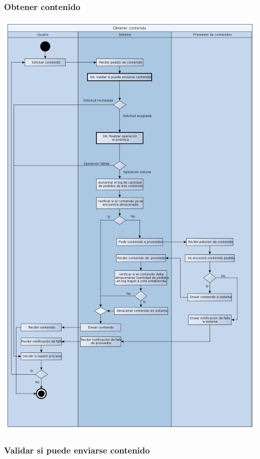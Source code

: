 \documentclass[11pt, a4paper, spanish]{article}
\begin{document}
{\newpage

\subsubsection{Obtener contenido}

	\begin{center}
		\includegraphics[scale=0.37]{Diagramas/06-ObtenerContenidoDA.png}
	\end{center}

\newpage

\subsubsection{Validar si puede enviarse contenido}

}
\end{document}
